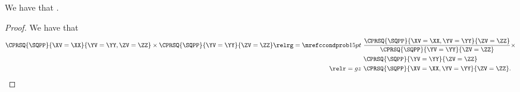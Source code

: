 \begin{proposition}
  We have that \sqcpcprobtomprobprop.%
\end{proposition}

\begin{proof}
  We have that 
  \begin{align*}
    \CPRSQ{\SQPP}{\XV = \XX}{\YV = \YY, \ZV = \ZZ} \times \CPRSQ{\SQPP}{\YV = \YY}{\ZV = \ZZ} 
    \relrg = {\mrefccondprob} 15pt &\ \frac{\CPRSQ{\SQPP}{\XV = \XX, \YV = \YY}{\ZV = \ZZ}}{\CPRSQ{\SQPP}{\YV = \YY}{\ZV = \ZZ}} \times \\ &\ \CPRSQ{\SQPP}{\YV = \YY}{\ZV = \ZZ} \\
    \relr = gz &\ \CPRSQ{\SQPP}{\XV = \XX, \YV = \YY}{\ZV = \ZZ}.
  \end{align*}
\end{proof}

